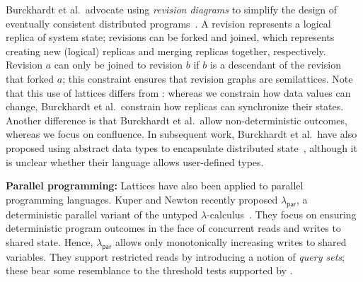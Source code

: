 Burckhardt et al.\ advocate using \emph{revision diagrams} to simplify the
design of eventually consistent distributed programs~\cite{Burckhardt2012a}. A
revision represents a logical replica of system state; revisions can be forked
and joined, which represents creating new (logical) replicas and merging
replicas together, respectively. Revision $a$ can only be joined to revision $b$
if $b$ is a descendant of the revision that forked $a$; this constraint ensures
that revision graphs are semilattices. Note that this use of lattices differs
from \lang: whereas we constrain how data values can change, Burckhardt et al.\
constrain how replicas can synchronize their states. Another difference is that
Burckhardt et al.\ allow non-deterministic outcomes, whereas we focus on
confluence. In subsequent work, Burckhardt et al.\ have also proposed using
abstract data types to encapsulate distributed state~\cite{Burckhardt2012b},
although it is unclear whether their language allows user-defined types.





\vspace{0.5em}\noindent
\textbf{Parallel programming:} Lattices have also been applied to parallel
programming languages. Kuper and Newton recently proposed
$\lambda_{\textsf{par}}$, a deterministic parallel variant of the untyped
$\lambda$-calculus~\cite{Kuper2012}. They focus on ensuring deterministic
program outcomes in the face of concurrent reads and writes to shared
state. Hence, $\lambda_{\textsf{par}}$ allows only monotonically increasing
writes to shared variables. They support restricted reads by introducing a
notion of \emph{query sets}; these bear some resemblance to the threshold tests
supported by \lang.

